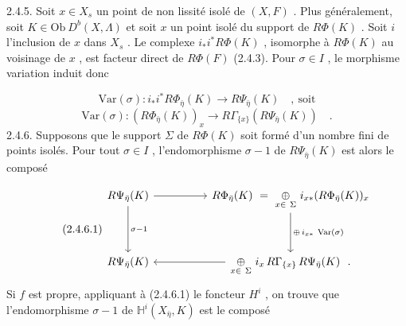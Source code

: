 
2.4.5. Soit $x \in X_s$ un point de non lissité isolé de $(X, F)$ . Plus généralement, soit $K \in \mathrm{Ob}\ D^b(X, \Lambda)$ et soit $x$ un point isolé du support de $R\Phi(K)$ . Soit $i$ l'inclusion de $x$ dans $X_s$ . Le complexe $i_*i^* R\Phi(K)$ , isomorphe à $R\Phi(K)$ au voisinage de $x$ , est facteur direct de $R\Phi(F)$ (2.4.3). Pour $\sigma \in I$ , le morphisme variation induit donc

\begin{equation*}
\mathrm{Var}(\sigma) : i_*i^* R\Phi_{\bar\eta}(K) \longrightarrow R\Psi_{\bar\eta}(K) \quad , \ \text{soit}
\end{equation*}
\begin{equation}\tag{2.4.5.1}
\mathrm{Var}(\sigma) : (R\Phi_{\bar\eta}(K))_x \longrightarrow R\Gamma_{\{x\}}(R\Psi_{\bar\eta}(K)) \quad .
\end{equation}
2.4.6. Supposons que le support $\Sigma$ de $R\Phi(K)$ soit formé d'un nombre fini de points isolés. Pour tout $\sigma \in I$ , l'endomorphisme $\sigma - 1$ de $R\Psi_{\bar\eta}(K)$ est alors le composé

\begin{equation}\tag{2.4.6.1}
\begin{tikzcd}[column sep=huge, row sep=huge]
R\Psi_{\bar\eta}(K) \arrow[r] \arrow[d, "\sigma-1"] & R\Phi_{\bar\eta}(K) \ =\ \underset{x\in\ \Sigma}{\oplus}\ i_{x*}(R\Phi_{\bar\eta}(K))_x \arrow[d, "{\oplus\, i_{x*}\ \mathrm{Var}(\sigma)}"] \\
R\Psi_{\bar\eta}(K) & \underset{x\in\ \Sigma}{\oplus}\ i_x\, R\Gamma_{\{x\}}\, R\Psi_{\bar\eta}(K)\ \ . \arrow[l]
\end{tikzcd}
\end{equation}
Si $f$ est propre, appliquant à (2.4.6.1) le foncteur $H^i$ , on trouve que l'endomorphisme $\sigma-1$ de $\mathbb{H}^i(X_{\bar\eta}, K)$ est le composé

